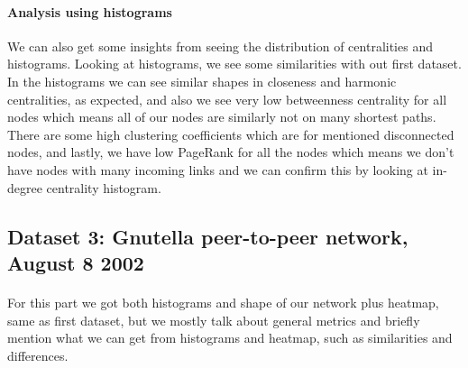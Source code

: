 \documentclass[letterpaper, 11pt]{article}
\newcommand{\1}{\mathds{1}}	%
\theoremstyle{definition}
\begin{document}
\paragraph{Analysis using histograms}We can also get some insights from seeing the distribution of centralities and histograms. Looking at histograms, we see some similarities with out first dataset. In the histograms we can see similar shapes in closeness and harmonic centralities, as expected, and also we see very low betweenness centrality for all nodes which means all of our nodes are similarly not on many shortest paths. There are some high clustering coefficients which are for mentioned disconnected nodes, and lastly, we have low PageRank for all the nodes which means we don't have nodes with many incoming links and we can confirm this by looking at in-degree centrality histogram.
\newpage
\subsection*{Dataset 3: Gnutella peer-to-peer network, August 8 2002}
\paragraph{}For this part we got both histograms and shape of our network plus heatmap, same as first dataset, but we mostly talk about general metrics and briefly mention what we can get from histograms and heatmap, such as similarities and differences.
\end{document}
